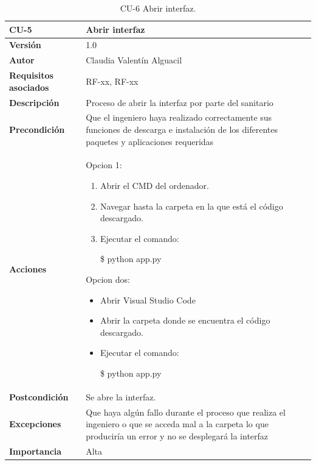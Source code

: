 \begin{table}[p]
	\centering
	\begin{tabularx}{\linewidth}{ p{} p{} }
		\toprule
		\textbf{CU-5}    & \textbf{Abrir interfaz}\\
		\toprule
		\textbf{Versión}              & 1.0    \\
		\textbf{Autor}                & Claudia Valentín Alguacil \\
		\textbf{Requisitos asociados} & RF-xx, RF-xx \\
		\textbf{Descripción}          & Proceso de abrir la interfaz por parte del sanitario \\
		\textbf{Precondición}         & Que el ingeniero haya realizado correctamente sus funciones de descarga e instalación de los diferentes paquetes y aplicaciones requeridas \\
		\textbf{Acciones}             &
        Opcion 1: 
		\begin{enumerate}
			\def\labelenumi{\arabic{enumi}.}
			\tightlist
			\item Abrir el CMD del ordenador.
			\item Navegar hasta la carpeta en la que está el código descargado.
                \item Ejecutar el comando:
                
                \$ python app.py
		\end{enumerate}
        Opcion dos:
        \begin{itemize}
        \def\labelenumi{\arabic{enumi}.}
		  \tightlist
            \item Abrir Visual Studio Code
            \item Abrir la carpeta donde se encuentra el código descargado.
            \item Ejecutar el comando:
                
            \$ python app.py
        \end{itemize} \\
		\textbf{Postcondición}        &  Se abre la interfaz. \\
		\textbf{Excepciones}          & Que haya algún fallo durante el proceso que realiza el ingeniero o que se acceda mal a la carpeta lo que produciría un error y no se desplegará la interfaz \\
		\textbf{Importancia}          & Alta \\
		\bottomrule
	\end{tabularx}
	\caption{CU-6 Abrir interfaz.}
\end{table}

